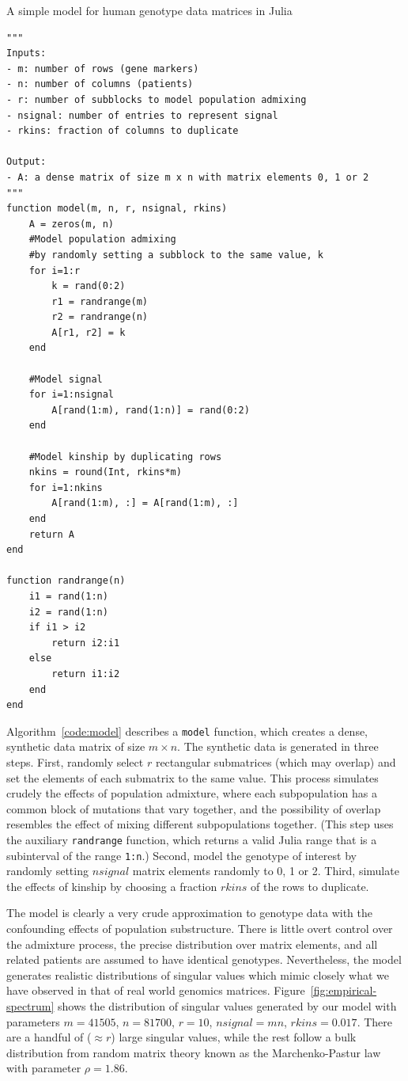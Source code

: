 \documentclass[review]{siamart0516}
\begin{document}
\begin{algorithm}
\caption{A simple model for human genotype data matrices in Julia
\label{code:model}}
\begin{lstlisting}
"""
Inputs:
- m: number of rows (gene markers)
- n: number of columns (patients)
- r: number of subblocks to model population admixing
- nsignal: number of entries to represent signal
- rkins: fraction of columns to duplicate

Output:
- A: a dense matrix of size m x n with matrix elements 0, 1 or 2
"""
function model(m, n, r, nsignal, rkins)
    A = zeros(m, n)
    #Model population admixing
    #by randomly setting a subblock to the same value, k
    for i=1:r
        k = rand(0:2)
        r1 = randrange(m)
        r2 = randrange(n)
        A[r1, r2] = k
    end

    #Model signal
    for i=1:nsignal
        A[rand(1:m), rand(1:n)] = rand(0:2)
    end

    #Model kinship by duplicating rows
    nkins = round(Int, rkins*m)
    for i=1:nkins
        A[rand(1:m), :] = A[rand(1:m), :]
    end
    return A
end

function randrange(n)
    i1 = rand(1:n)
    i2 = rand(1:n)
    if i1 > i2
        return i2:i1
    else
        return i1:i2
    end
end
\end{lstlisting}
\end{algorithm}

Algorithm~\ref{code:model} describes a \verb|model| function, which creates a
dense, synthetic data matrix of size $m\times n$. The synthetic data is
generated in three steps. First, randomly select $r$ rectangular submatrices
(which may overlap) and set the elements of each submatrix to the same value.
This process simulates crudely the effects of population admixture, where
each subpopulation has a common block of mutations that vary together, and the
possibility of overlap resembles the effect of mixing different subpopulations
together. (This step uses the auxiliary \verb|randrange| function, which returns
a valid Julia range that is a subinterval of the range \verb|1:n|.)
Second, model the genotype of interest by randomly setting $nsignal$ matrix
elements randomly to 0, 1 or 2.
Third, simulate the effects of kinship by choosing a fraction $rkins$ of the
rows to duplicate.

The model is clearly a very crude approximation to genotype data with the
confounding effects of population substructure. There is little overt control
over the admixture process, the precise distribution over matrix elements, and
all related patients are assumed to have identical genotypes. Nevertheless, the
model generates realistic distributions of singular values which mimic closely
what we have observed in that of real world genomics matrices.
Figure~\ref{fig:empirical-spectrum} shows the distribution of singular values
generated by our model with parameters $m=41505$, $n=81700$, $r=10$,
$nsignal=mn$, $rkins=0.017$.
There are a handful of ($\approx r$) large singular values,
while the rest follow a bulk distribution from random matrix theory known as the
Marchenko-Pastur law~\cite{Marchenko1967} with parameter $\rho = 1.86$.
\end{document}
